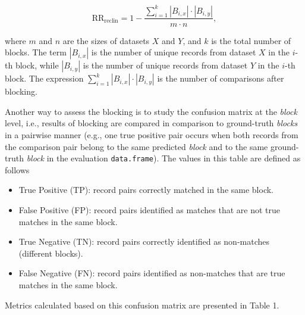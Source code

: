\[
\text{RR}_{\text{reclin}} = 1 - \frac{\sum\limits_{i=1}^{k} |B_{i,x}| \cdot |B_{i,y}|} {m \cdot n},
\]

\noindent where \(m\) and \(n\) are the sizes of datasets \(X\) and \(Y\), and
\(k\) is the total number of blocks. The term \(|B_{i,x}|\) is the number of
unique records from dataset \(X\) in the \(i\)-th block, while \(|B_{i,y}|\)
is the number of unique records from dataset \(Y\) in the \(i\)-th block.
The expression \(\sum\limits_{i=1}^{k} |B_{i,x}| \cdot |B_{i,y}|\) is the
number of comparisons after blocking.

Another way to assess the blocking is to study the confusion matrix at
the \emph{block} level, i.e., results of blocking are compared in comparison
to ground-truth \emph{blocks} in a pairwise manner (e.g., one true positive
pair occurs when both records from the comparison pair belong to the
same predicted \emph{block} and to the same ground-truth \emph{block} in the
evaluation \texttt{data.frame}). The values in this table are defined as
follows

\begin{itemize}
\tightlist
\item
  True Positive (TP): record pairs correctly matched in the same
  block.
\item
  False Positive (FP): record pairs identified as matches that are
  not true matches in the same block.
\item
  True Negative (TN): record pairs correctly identified as non-matches
  (different blocks).
\item
  False Negative (FN): record pairs identified as non-matches that are true
  matches in the same block.
\end{itemize}

Metrics calculated based on this confusion matrix are presented in Table 1.

